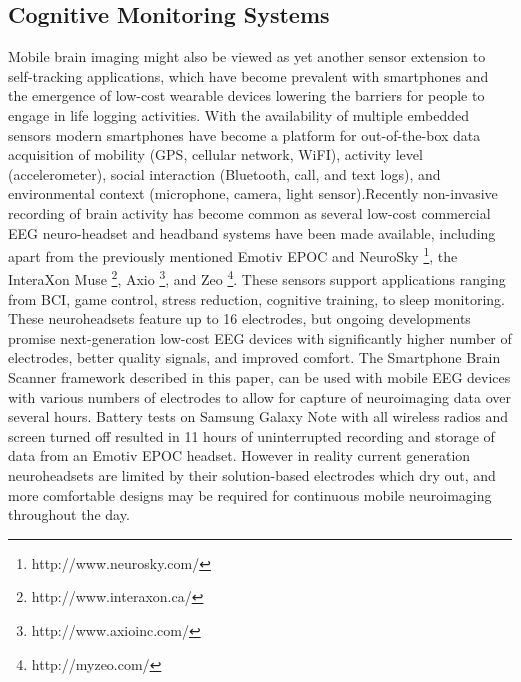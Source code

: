 \documentclass[10pt]{article}
\begin{document}
	\subsection{Cognitive Monitoring Systems}
Mobile brain imaging might also be viewed as yet another sensor extension to self-tracking applications, which have become prevalent with smartphones and the emergence of low-cost wearable devices lowering the barriers for people to engage in life logging activities\cite{swan2012sensor}. With the availability of multiple embedded sensors modern smartphones have become a platform for out-of-the-box data acquisition of mobility (GPS, cellular network, WiFI), activity level (accelerometer), social interaction (Bluetooth, call, and text logs), and environmental context (microphone, camera, light sensor)\cite{aharony2011social}.Recently non-invasive recording of brain activity has become common as several low-cost commercial EEG neuro-headset and headband systems have been made available, including apart from the previously mentioned Emotiv EPOC and NeuroSky \footnote{http://www.neurosky.com/}, the InteraXon Muse \footnote{http://www.interaxon.ca/}, Axio  \footnote{http://www.axioinc.com/}, and Zeo \footnote{http://myzeo.com/}. These sensors support applications ranging from BCI, game control, stress reduction, cognitive training, to sleep monitoring. These neuroheadsets feature up to 16 electrodes, but ongoing developments promise next-generation low-cost EEG devices with significantly higher number of electrodes, better quality signals, and improved comfort. The Smartphone Brain Scanner framework described in this paper, can be used with mobile EEG devices with various numbers of electrodes to allow for capture of neuroimaging data over several hours. Battery tests on Samsung Galaxy Note with all wireless radios and screen turned off resulted in 11 hours of uninterrupted recording and storage of data from an Emotiv EPOC headset. However in reality current generation neuroheadsets are limited by their solution-based electrodes which dry out, and more comfortable designs\cite{debener2012taking,looney2012ear} may be required for continuous mobile neuroimaging throughout the day.
\end{document}
